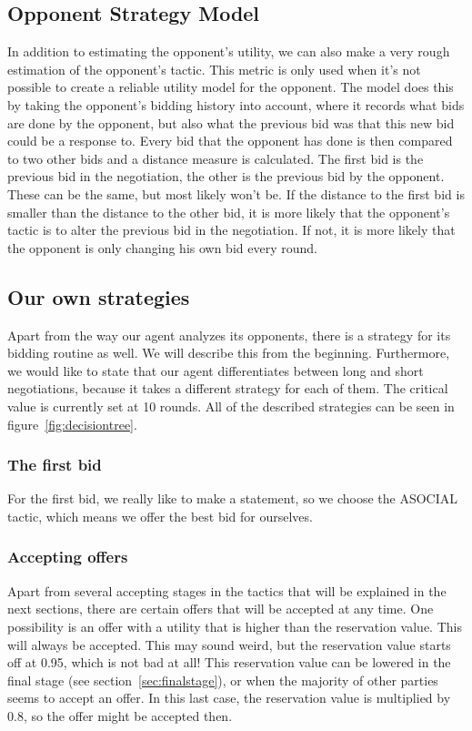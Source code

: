 \subsection{Opponent Strategy Model}
\label{sec:opponentstrategymodel}
In addition to estimating the opponent's utility, we can also make a very rough estimation of the opponent's tactic. This metric is only used when it's not possible to create a reliable utility model for the opponent. The model does this by taking the opponent's bidding history into account, where it records what bids are done by the opponent, but also what the previous bid was that this new bid could be a response to. Every bid that the opponent has done is then compared to two other bids and a distance measure is calculated. The first bid is the previous bid in the negotiation, the other is the previous bid by the opponent. These can be the same, but most likely won't be. If the distance to the first bid is smaller than the distance to the other bid, it is more likely that the opponent's tactic is to alter the previous bid in the negotiation. If not, it is more likely that the opponent is only changing his own bid every round. 

\subsection{Our own strategies}
\label{sec:strategy}
Apart from the way our agent analyzes its opponents, there is a strategy for its bidding routine as well. We will describe this from the beginning. Furthermore, we would like to state that our agent differentiates between long and short negotiations, because it takes a different strategy for each of them. The critical value is currently set at 10 rounds. All of the described strategies can be seen in figure~\ref{fig:decisiontree}.



\subsubsection{The first bid}
For the first bid, we really like to make a statement, so we choose the ASOCIAL tactic, which means we offer the best bid for ourselves.

\subsubsection{Accepting offers}
Apart from several accepting stages in the tactics that will be explained in the next sections, there are certain offers that will be accepted at any time. One possibility is an offer with a utility that is higher than the reservation value. This will always be accepted. This may sound weird, but the reservation value starts off at 0.95, which is not bad at all! This reservation value can be lowered in the final stage (see section~\ref{sec:finalstage}), or when the majority of other parties seems to accept an offer. In this last case, the reservation value is multiplied by 0.8, so the offer might be accepted then.

